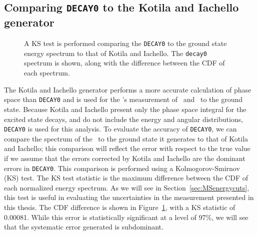 \documentclass[/main.tex]{subfiles}
\begin{document}
\subsection{Comparing \texttt{DECAY0} to the Kotila and Iachello generator} \label{sec:decay0vskandi}
\begin{figure}
  \centering
  \caption[KS test comparing \texttt{decay0} to Kotila and Iachello \tnbb to g.s. spectra]{\label{fig:kstest}
    A KS test is performed comparing the \texttt{DECAY0} \tnbb to the ground state energy spectrum to that of Kotila and Iachello. The \texttt{decay0} spectrum is shown, along with the difference between the CDF of each spectrum.
  }
\end{figure}
The Kotila and Iachello generator performs a more accurate calculation of phase space than \texttt{DECAY0} and is used for the \MJD 's measurement of \tnbb\ and \znbb\ to the ground state.
Because Kotila and Iachello present only the phase space integral for the excited state decays, and do not include the energy and angular distributions, \texttt{DECAY0} is used for this analysis.
To evaluate the accuracy of \texttt{DECAY0}, we can compare the spectrum of the \tnbb\ to the ground state it generates to that of Kotila and Iachello; this comparison will reflect the error with respect to the true value if we assume that the errors corrected by Kotila and Iachello are the dominant errors in \texttt{DECAY0}.
This comparison is performed using a Kolmogorov-Smirnov (KS) test.
The KS test statistic is the maximum difference between the CDF of each normalized energy spectrum.
As we will see in Section~\ref{sec:MSenergycuts}, this test is useful in evaluating the uncertainties in the measurement presented in this thesis.
The CDF difference is shown in Figure~\ref{fig:kstest}, with a KS statistic of 0.00081.
While this error is statistically significant at a level of 97\%, we will see that the systematic error generated is subdominant.
\end{document}

